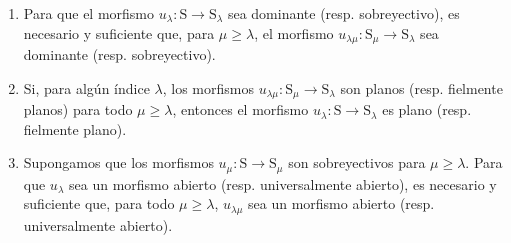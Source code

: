 \begin{proposition}[8.3.8]
\label{IV.8.3.8}
\begin{enumerate}[label=(\roman*)]
   \item Para que el morfismo $u_\lambda:\mathrm{S}\to\mathrm{S}_\lambda$ sea dominante (resp. sobreyectivo), es necesario y suficiente que, para $\mu\geqslant\lambda$, el morfismo $u_{\lambda\mu}:\mathrm{S}_\mu\to\mathrm{S}_\lambda$ sea dominante (resp. sobreyectivo).
   \item Si, para algún índice $\lambda$, los morfismos $u_{\lambda\mu}:\mathrm{S}_\mu\to\mathrm{S}_\lambda$ son planos (resp. fielmente planos) para todo $\mu\geqslant\lambda$, entonces el morfismo $u_\lambda:\mathrm{S}\to\mathrm{S}_\lambda$ es plano (resp. fielmente plano).
   \item Supongamos que los morfismos $u_\mu:\mathrm{S}\to\mathrm{S}_\mu$ son sobreyectivos para $\mu\geqslant\lambda$.
Para que $u_\lambda$ sea un morfismo abierto (resp. universalmente abierto), es necesario y suficiente que, para todo $\mu\geqslant\lambda$, $u_{\lambda\mu}$ sea un morfismo abierto (resp. universalmente abierto).
\end{enumerate}
\end{proposition}

